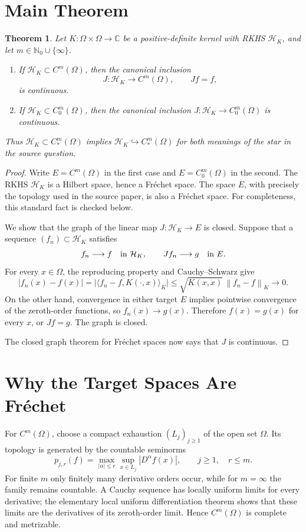 \documentclass[11pt]{article}
\newtheorem{theorem}{Theorem}
\newcommand{\Hk}{\mathcal H_K}
\newcommand{\norm}[1]{\left\lVert #1\right\rVert}
\newcommand{\C}{\mathbb C}
\begin{document}
\section*{Main Theorem}

\begin{theorem}\label{thm:main}
Let $K:\Omega\times\Omega\to\C$ be a positive-definite kernel with RKHS
\(\Hk\), and let $m\in\mathbb N_0\cup\{\infty\}$.
\begin{enumerate}
\item If \(\Hk\subset C^m(\Omega)\), then the canonical inclusion
\[
J:\Hk\longrightarrow C^m(\Omega),\qquad Jf=f,
\]
is continuous.
\item If \(\Hk\subset C^m_0(\Omega)\), then the canonical inclusion
\(J:\Hk\to C^m_0(\Omega)\) is continuous.
\end{enumerate}
Thus \(\Hk\subset C^m_*(\Omega)\) implies
\(\Hk\hookrightarrow C^m_*(\Omega)\) for both meanings of the star in the
source question.
\end{theorem}

\begin{proof}
Write $E=C^m(\Omega)$ in the first case and $E=C^m_0(\Omega)$ in the
second.  The RKHS \(\Hk\) is a Hilbert space, hence a Fr\'echet space.  The
space $E$, with precisely the topology used in the source paper, is also a
Fr\'echet space.  For completeness, this standard fact is checked below.

We show that the graph of the linear map $J:\Hk\to E$ is closed.  Suppose
that a sequence \((f_n)\subset\Hk\) satisfies
\[
 f_n\longrightarrow f\quad\hbox{in }\Hk,
 \qquad
 Jf_n\longrightarrow g\quad\hbox{in }E.
\]
For every $x\in\Omega$, the reproducing property and Cauchy--Schwarz give
\[
 |f_n(x)-f(x)|
 =\bigl|\langle f_n-f,K(\cdot,x)\rangle_K\bigr|
 \leq \sqrt{K(x,x)}\,\norm{f_n-f}_K\longrightarrow0.
\]
On the other hand, convergence in either target $E$ implies pointwise
convergence of the zeroth-order functions, so $f_n(x)\to g(x)$.  Therefore
$f(x)=g(x)$ for every $x$, or $Jf=g$.  The graph is closed.

The closed graph theorem for Fr\'echet spaces
\cite[Chapter~2]{Rudin} now says that $J$ is continuous.
\end{proof}

\section*{Why the Target Spaces Are Fr\'echet}

For $C^m(\Omega)$, choose a compact exhaustion \((L_j)_{j\geq1}\) of the
open set \(\Omega\).  Its topology is generated by the countable seminorms
\[
 p_{j,r}(f)=\max_{|\alpha|\leq r}\sup_{x\in L_j}|D^\alpha f(x)|,
 \qquad j\geq1,\quad r\leq m.
\]
For finite $m$ only finitely many derivative orders occur, while for
$m=\infty$ the family remains countable.  A Cauchy sequence has locally
uniform limits for every derivative; the elementary local uniform
differentiation theorem shows that these limits are the derivatives of its
zeroth-order limit.  Hence $C^m(\Omega)$ is complete and metrizable.
\end{document}

